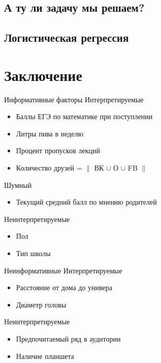 \documentclass[14pt, fleqn, xcolor={dvipsnames, table}]{beamer}
\begin{document}
\subsection{А ту ли задачу мы решаем?}
\subsection{Логистическая регрессия}
\section{Заключение}
\begin{frame}{Информативные факторы}
Интерпретируемые
\begin{itemize}
  \item Баллы ЕГЭ по математике при поступлении
  \item Литры пива в неделю
  \item Процент пропусков лекций
  \item Количество друзей = $\|$ ВК $\cup$ О $\cup$ FB $\|$
\end{itemize}
Шумный
\begin{itemize}
  \item Текущий средний балл по мнению родителей
\end{itemize}
Неинтерпретируемые
\begin{itemize}
  \item Пол
  \item Тип школы
\end{itemize}
\end{frame}

\begin{frame}[t]{Неинформативные}
Интерпретируемые
\begin{itemize}
  \item Расстояние от дома до универа
  \item Диаметр головы
\end{itemize}
Неинтерпретируемые
\begin{itemize}
  \item Предпочитаемый ряд в аудитории
  \item Наличие планшета
\end{itemize}    
\end{frame}
\end{document}
